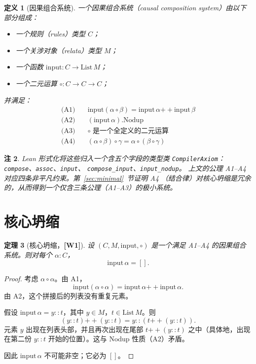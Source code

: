 \documentclass[11pt]{ctexart}
\newcommand{\wone}[1]{\textcolor{wcolor}{\textbf{[#1]}}}
\newtheorem{theorem}{定理}
\newtheorem{definition}[theorem]{定义}
\newtheorem{remark}[theorem]{注}
\begin{document}
\begin{definition}[因果组合系统]
\label{def:system}
一个\emph{因果组合系统}（causal composition system）由以下部分组成：
\begin{itemize}
\item 一个\emph{规则}（rules）类型 $C$；
\item 一个\emph{关涉对象}（relata）类型 $M$；
\item 一个函数 $\mathrm{input} : C \to \mathrm{List}\,M$；
\item 一个二元运算 $\circ : C \to C \to C$；
\end{itemize}
并满足：
\begin{align}
\text{(A1)}\quad & \mathrm{input}(\alpha \circ \beta)
  = \mathrm{input}\,\alpha \mathbin{+\!+}
    \mathrm{input}\,\beta
  \label{ax:additive}\\
\text{(A2)}\quad & (\mathrm{input}\,\alpha).\mathrm{Nodup}
  \label{ax:nodup}\\
\text{(A3)}\quad & \circ \text{ 是一个全定义的二元运算}
  \label{ax:compose}\\
\text{(A4)}\quad & (\alpha \circ \beta) \circ \gamma
  = \alpha \circ (\beta \circ \gamma)
  \label{ax:assoc}
\end{align}
\end{definition}

\begin{remark}
Lean 形式化将这些归入一个含五个字段的类型类 \texttt{CompilerAxiom}：
\texttt{compose}、\texttt{assoc}、\texttt{input}、
\texttt{compose\_input}、\texttt{input\_nodup}。
上文的公理 A1--A4 对应四条非平凡约束。第~\ref{sec:minimal}~节证明 A4
（结合律）对核心坍缩是冗余的，从而得到一个仅含三条公理（A1--A3）的极小系统。
\end{remark}

\section{核心坍缩}
\label{sec:core}

\begin{theorem}[核心坍缩，\wone{W1}]
\label{thm:core}
设 $(C, M, \mathrm{input}, \circ)$ 是一个满足 A1--A4 的因果组合系统。则对每个 $\alpha : C$，
\[
\mathrm{input}\,\alpha = [].
\]
\end{theorem}

\begin{proof}
考虑 $\alpha \circ \alpha$。由 A1，
\[
\mathrm{input}(\alpha \circ \alpha)
  = \mathrm{input}\,\alpha \mathbin{+\!+}
    \mathrm{input}\,\alpha.
\]
由 A2，这个拼接后的列表没有重复元素。

假设 $\mathrm{input}\,\alpha = y :: t$，其中 $y \in M$，$t \in \mathrm{List}\,M$。则
\[
(y :: t) \mathbin{+\!+} (y :: t)
  = y :: (t \mathbin{+\!+} (y :: t)).
\]
元素 $y$ 出现在列表头部，并且再次出现在尾部 $t \mathbin{+\!+} (y :: t)$ 之中（具体地，出现在第二份 $y :: t$ 开始的位置）。这与 Nodup 性质（A2）矛盾。

因此 $\mathrm{input}\,\alpha$ 不可能非空；它必为 $[]$。
\end{proof}
\end{document}
